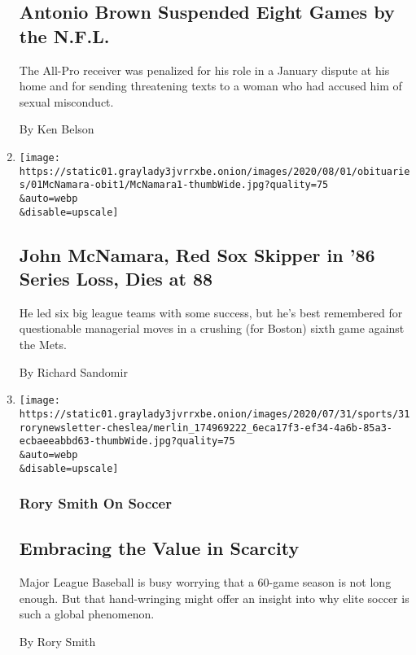 \begin{enumerate}
  \hypertarget{antonio-brown-suspended-eight-games-by-the-nfl}{%
  \subsection{Antonio Brown Suspended Eight Games by the
  N.F.L.}\label{antonio-brown-suspended-eight-games-by-the-nfl}}

  The All-Pro receiver was penalized for his role in a January dispute
  at his home and for sending threatening texts to a woman who had
  accused him of sexual misconduct.

  By Ken Belson
\item
  \href{/2020/07/31/sports/baseball/john-mcnamara-dead.html}{}

  \texttt{[image: https://static01.graylady3jvrrxbe.onion/images/2020/08/01/obituaries/01McNamara-obit1/McNamara1-thumbWide.jpg?quality=75\\\&auto=webp\\\&disable=upscale]}

  \hypertarget{john-mcnamara-red-sox-skipper-in-86-series-loss-dies-at-88}{%
  \subsection{John McNamara, Red Sox Skipper in '86 Series Loss, Dies at
  88}\label{john-mcnamara-red-sox-skipper-in-86-series-loss-dies-at-88}}

  He led six big league teams with some success, but he's best
  remembered for questionable managerial moves in a crushing (for
  Boston) sixth game against the Mets.

  By Richard Sandomir
\item
  \href{/2020/07/31/sports/soccer/soccer-baseball.html}{}

  \texttt{[image: https://static01.graylady3jvrrxbe.onion/images/2020/07/31/sports/31rorynewsletter-cheslea/merlin\_174969222\_6eca17f3-ef34-4a6b-85a3-ecbaeeabbd63-thumbWide.jpg?quality=75\\\&auto=webp\\\&disable=upscale]}

  \hypertarget{rory-smith-on-soccer}{%
  \subsubsection{Rory Smith On Soccer}\label{rory-smith-on-soccer}}

  \hypertarget{embracing-the-value-in-scarcity}{%
  \subsection{Embracing the Value in
  Scarcity}\label{embracing-the-value-in-scarcity}}

  Major League Baseball is busy worrying that a 60-game season is not
  long enough. But that hand-wringing might offer an insight into why
  elite soccer is such a global phenomenon.

  By Rory Smith
\end{enumerate}


